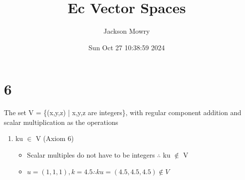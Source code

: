\documentclass[11pt]{article}
\author{Jackson Mowry}
\date{Sun Oct 27 10:38:59 2024}
\title{Ec Vector Spaces}
\begin{document}
\maketitle
\section{6}
\label{sec:orgc00514a}
The set V = \{(x,y,z) | x,y,z are integers\}, with regular component addition and scalar multiplication as the operations\\
\begin{enumerate}
\item ku \(\in\) V (Axiom 6)\\
\begin{itemize}
\item Scalar multiples do not have to be integers \(\therefore\) ku \(\notin\) V\\
\item \(u = (1,1,1), k = 4.5 \therefore ku = (4.5,4.5,4.5) \notin{} V\)\\
\end{itemize}
\end{enumerate}
\end{document}
